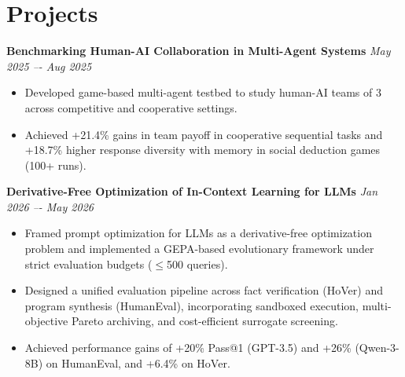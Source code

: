 \documentclass[a4paper,10pt]{article}
\begin{document}
\section*{Projects}
{\color{boldcolor}\textbf{Benchmarking Human-AI Collaboration in Multi-Agent Systems}}
\href{https://github.com/mihirupadhyay/Benchmarking-Human-AI-Collaboration-in-Multi-Agent-Systems}{\fontsize{8}{12}\selectfont\textcolor{darksilver}{\faLink}} \hfill \textit{\small May 2025 –- Aug 2025}
\begin{itemize}
    \item Developed game-based multi-agent testbed to study human-AI teams of 3 across competitive and cooperative settings.
    \item Achieved +21.4\% gains in team payoff in cooperative sequential tasks and +18.7\% higher response diversity with memory in social deduction games (100+ runs).
\end{itemize}

{\color{boldcolor}\textbf{\textbf{Derivative-Free Optimization of In-Context Learning for LLMs}}}
\href{https://github.com/mihirupadhyay/Derivative-Free-Optimization-of-In-Context-Learning-for-LLMs}{\fontsize{8}{12}\selectfont\textcolor{darksilver}{\faLink}} \hfill \textit{\small Jan 2026 –- May 2026}
\begin{itemize}
    \item Framed prompt optimization for LLMs as a derivative-free optimization problem and implemented a GEPA-based evolutionary framework under strict evaluation budgets ($\leq$500 queries).
    \item Designed a unified evaluation pipeline across fact verification (HoVer) and program synthesis (HumanEval), incorporating sandboxed execution, multi-objective Pareto archiving, and cost-efficient surrogate screening.
    \item Achieved performance gains of +20\% Pass@1 (GPT-3.5) and +26\% (Qwen-3-8B) on HumanEval, and +6.4\% on HoVer.
\end{itemize}

\end{document}
